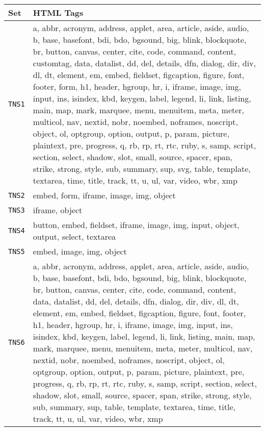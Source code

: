 \captionsetup[table]{skip=5pt}
\begin{table}[!t]
\centering
\begin{tabular}{l|p{}}
 \small \textbf{Set}
 &\xspace\xspace \small \textbf{HTML Tags} \\
\toprule
\small \texttt{TNS1} & \tiny {a, abbr, acronym, address, applet, area, article, aside, audio, b, base, basefont, bdi, bdo, bgsound, big, blink, blockquote, br, button, canvas, center, cite, code, command, content, customtag, data, datalist, dd, del, details, dfn, dialog, dir, div, dl, dt, element, em, embed, fieldset, figcaption, figure, font, footer, form, h1, header, hgroup, hr, i, iframe, image, img, input, ins, isindex, kbd, keygen, label, legend, li, link, listing, main, map, mark, marquee, menu, menuitem, meta, meter, multicol, nav, nextid, nobr, noembed, noframes, noscript, object, ol, optgroup, option, output, p, param, picture, plaintext, pre, progress, q, rb, rp, rt, rtc, ruby, s, samp, script, section, select, shadow, slot, small, source, spacer, span, strike, strong, style, sub, summary, sup, svg, table, template, textarea, time, title, track, tt, u, ul, var, video, wbr, xmp} \\
\midrule
\small \texttt{TNS2} & \tiny {embed, form, iframe, image, img, object} \\
\midrule
\small \texttt{TNS3} & \tiny {iframe, object} \\
\midrule
\small \texttt{TNS4} & \tiny {button, embed, fieldset, iframe, image, img, input, object, output, select, textarea} \\
\midrule
\small \texttt{TNS5} & \tiny {embed, image, img, object} \\
\midrule
\small \texttt{TNS6} & \tiny {a, abbr, acronym, address, applet, area, article, aside, audio, b, base, basefont, bdi, bdo, bgsound, big, blink, blockquote, br, button, canvas, center, cite, code, command, content, data, datalist, dd, del, details, dfn, dialog, dir, div, dl, dt, element, em, embed, fieldset, figcaption, figure, font, footer, h1, header, hgroup, hr, i, iframe, image, img, input, ins, isindex, kbd, keygen, label, legend, li, link, listing, main, map, mark, marquee, menu, menuitem, meta, meter, multicol, nav, nextid, nobr, noembed, noframes, noscript, object, ol, optgroup, option, output, p, param, picture, plaintext, pre, progress, q, rb, rp, rt, rtc, ruby, s, samp, script, section, select, shadow, slot, small, source, spacer, span, strike, strong, style, sub, summary, sup, table, template, textarea, time, title, track, tt, u, ul, var, video, wbr, xmp} \\

\end{tabular}
\end{table}
